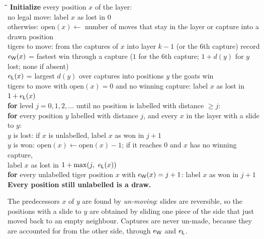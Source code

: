 \begin{algorithm}[H]
\caption{Retrograde analysis of one movement layer $k$ (both sides to move)}\label{alg:retro}
\begin{tabbing}
\hspace{1.6em}\=\hspace{1.6em}\=\hspace{1.6em}\=\kill
\textbf{Initialize} every position $x$ of the layer: \\
\> no legal move: label $x$ as lost in 0 \\
\> otherwise: $\text{open}(x) \leftarrow$ number of moves that stay in the layer or capture into a drawn position \\
\> tigers to move: from the captures of $x$ into layer $k - 1$ (or the 6th capture) record \\
\>\> $e_{\mathsf{W}}(x)$ = fastest win through a capture ($1$ for the 6th capture; $1 + d(y)$ for $y$ lost; none if absent) \\
\>\> $e_{\mathsf{L}}(x)$ = largest $d(y)$ over captures into positions $y$ the goats win \\
\> tigers to move with $\text{open}(x) = 0$ and no winning capture: label $x$ as lost in $1 + e_{\mathsf{L}}(x)$ \\
\textbf{for} level $j = 0, 1, 2, \dots$ until no position is labelled with distance $\ge j$: \\
\> \textbf{for} every position $y$ labelled with distance $j$, and every $x$ in the layer with a slide to $y$: \\
\>\> $y$ is lost: if $x$ is unlabelled, label $x$ as won in $j + 1$ \\
\>\> $y$ is won: $\text{open}(x) \leftarrow \text{open}(x) - 1$; if it reaches 0 and $x$ has no winning capture, \\
\>\>\> label $x$ as lost in $1 + \max(j,\ e_{\Lo}(x))$ \\
\> \textbf{for} every unlabelled tiger position $x$ with $e_{\mathsf{W}}(x) = j + 1$: label $x$ as won in $j + 1$ \\
\textbf{Every position still unlabelled is a draw.}
\end{tabbing}
\end{algorithm}

The predecessors $x$ of $y$ are found by \emph{un-moving}: slides are reversible, so the positions with a slide
to $y$ are obtained by sliding one piece of the side that just moved back to an empty neighbour. Captures
are never un-made, because they are accounted for from the other side, through $e_{\mathsf{W}}$ and $e_{\mathsf{L}}$.

